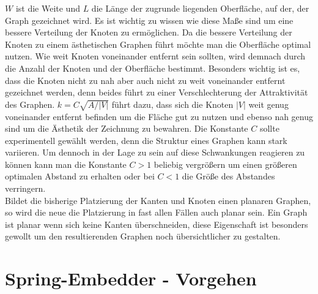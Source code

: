 $W$ ist die Weite und $L$ die Länge der zugrunde liegenden Oberfläche, auf der, der Graph gezeichnet wird. Es ist
wichtig zu wissen wie diese Maße sind um eine bessere Verteilung der Knoten zu ermöglichen. Da die bessere Verteilung der Knoten zu einem ästhetischen Graphen führt möchte man die Oberfläche optimal nutzen. Wie weit Knoten voneinander entfernt sein sollten, wird demnach durch die Anzahl der Knoten und der Oberfläche bestimmt. Besonders wichtig ist es, dass die Knoten nicht zu nah aber auch nicht zu weit voneinander entfernt gezeichnet werden, denn beides führt zu einer Verschlechterung der Attraktivität des Graphen. $k = C\sqrt{A / |V|}$ führt dazu, dass sich die Knoten $|V|$ weit genug voneinander entfernt befinden um die Fläche gut zu nutzen und ebenso nah genug sind um die Ästhetik der Zeichnung zu bewahren. Die Konstante $C$ sollte experimentell gewählt werden, denn die Struktur eines Graphen kann stark variieren. Um dennoch in der Lage zu sein auf diese Schwankungen reagieren zu können kann man die Konstante $C > 1$ beliebig vergrößern um einen größeren optimalen Abstand zu erhalten oder bei $C < 1$ die Größe des Abstandes verringern. \\





Bildet die bisherige 
Platzierung der Kanten und Knoten einen planaren Graphen, so wird die neue die Platzierung in fast allen Fällen
auch planar sein. Ein Graph ist planar wenn sich keine Kanten überschneiden, diese Eigenschaft ist besonders gewollt um den resultierenden Graphen noch übersichtlicher zu gestalten.





\section{Spring-Embedder - Vorgehen}
\label{Kapitel_3_-_Unterkapitel_2}
%

